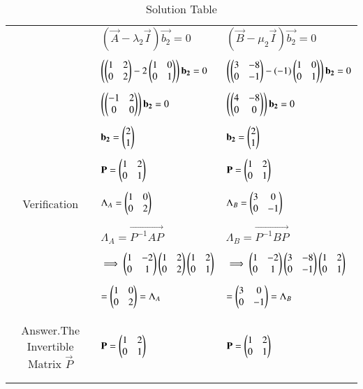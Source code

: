\documentclass[journal,12pt]{IEEEtran}
\begin{document}
\begin{longtable}{|c|l|l|}
 &$(\vec{A}-\lambda_2\vec{I})\vec{b_2}=0$&$(\vec{B}-\mu_2\vec{I})\vec{b_2}=0$\\
 &&\\
 &$\left(\begin{pmatrix}1&2\\0&2\end{pmatrix}-2\begin{pmatrix}1&0\\0&1\end{pmatrix}\right)\mathbf{b_2}=0$&$\left(\begin{pmatrix}3&-8\\0&-1\end{pmatrix}-(-1)\begin{pmatrix}1&0\\0&1\end{pmatrix}\right)\mathbf{b_2}=0$\\
 &&\\
 &$\left(\begin{pmatrix}-1&2\\0&0\end{pmatrix}\right)\mathbf{b_2}=0$&$\left(\begin{pmatrix}4&-8\\0&0\end{pmatrix}\right)\mathbf{b_2}=0$\\
 &&\\
 & $\mathbf{b_2}=\begin{pmatrix}2\\1\end{pmatrix}$&$\mathbf{b_2}=\begin{pmatrix}2\\1\end{pmatrix}$\\
 &&\\
 &$\mathbf{P}=\begin{pmatrix}1&2\\0&1\end{pmatrix}$&$\mathbf{P}=\begin{pmatrix}1&2\\0&1\end{pmatrix}$\\
 \hline
 \newpage
 \hline
 \multirow{3}{*}
 &&\\
 Verification& $\Lambda_A=\begin{pmatrix}1&0\\0&2\end{pmatrix}$ & $\Lambda_B=\begin{pmatrix}3&0\\0&-1\end{pmatrix}$\\
 &&\\
 &$\Lambda_{A}=\vec{P^{-1}AP}$&$\Lambda_{B}=\vec{P^{-1}BP}$\\
 &&\\
 &$\implies\begin{pmatrix}1&-2\\0&1\end{pmatrix}\begin{pmatrix}1&2\\0&2\end{pmatrix}\begin{pmatrix}1&2\\0&1\end{pmatrix}$&$\implies\begin{pmatrix}1&-2\\0&1\end{pmatrix}\begin{pmatrix}3&-8\\0&-1\end{pmatrix}\begin{pmatrix}1&2\\0&1\end{pmatrix}$\\
 &&\\
&$=\begin{pmatrix}1&0\\0&2\end{pmatrix}=\Lambda_A$ & $=\begin{pmatrix}3&0\\0&-1\end{pmatrix}=\Lambda_B$\\
&&\\
\hline
&&\\
Answer.The Invertible Matrix $\vec{P}$&$\mathbf{P}=\begin{pmatrix}1&2\\0&1\end{pmatrix}$&$\mathbf{P}=\begin{pmatrix}1&2\\0&1\end{pmatrix}$\\
&&\\
\hline
	
	\caption{Solution Table}
    \label{table:2}
\end{longtable}
\end{document}
